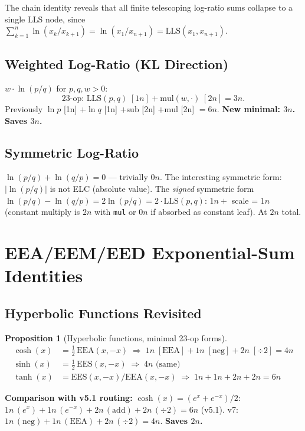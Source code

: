 \documentclass[11pt]{article}
\newtheorem{proposition}[theorem]{Proposition}
\begin{document}
The chain identity reveals that all finite telescoping log-ratio sums collapse to a single
LLS node, since $\sum_{k=1}^n\ln(x_k/x_{k+1})=\ln(x_1/x_{n+1})=\mathrm{LLS}(x_1,x_{n+1})$.

\subsection{Weighted Log-Ratio (KL Direction)}

$w\cdot\ln(p/q)$ for $p,q,w>0$:
\[
\text{23-op: }\mathrm{LLS}(p,q)\;[1n]+\mathrm{mul}(w,\cdot)\;[2n]=3n.
\]
Previously $\ln p$ [1n] $+\ln q$ [1n] $+\mathrm{sub}$ [2n] $+\mathrm{mul}$ [2n] $=6n$.
\textbf{New minimal: $3n$. Saves $3n$.}

\subsection{Symmetric Log-Ratio}

$\ln(p/q)+\ln(q/p)=0$ — trivially $0n$. The interesting symmetric form:
$|\ln(p/q)|$ is not ELC (absolute value). The \emph{signed} symmetric form
$\ln(p/q)-\ln(q/p)=2\ln(p/q)=2\cdot\mathrm{LLS}(p,q)$: $1n+$ scale = $1n$ (constant multiply
is $2n$ with \texttt{mul} or $0n$ if absorbed as constant leaf). At $2n$ total.

\section{EEA/EEM/EED Exponential-Sum Identities}

\subsection{Hyperbolic Functions Revisited}

\begin{proposition}[Hyperbolic functions, minimal 23-op forms]
\begin{align*}
\cosh(x)&=\tfrac12\,\mathrm{EEA}(x,-x)
  \;\Rightarrow\;1n\;[\mathrm{EEA}]+1n\;[\mathrm{neg}]+2n\;[\div 2]=4n\\
\sinh(x)&=\tfrac12\,\mathrm{EES}(x,-x)
  \;\Rightarrow\;4n\text{ (same)}\\
\tanh(x)&=\mathrm{EES}(x,-x)/\mathrm{EEA}(x,-x)
  \;\Rightarrow\;1n+1n+2n+2n=6n
\end{align*}
\end{proposition}

\textbf{Comparison with v5.1 routing:}
$\cosh(x)=(e^x+e^{-x})/2$: $1n\,(e^x)+1n\,(e^{-x})+2n\,(\text{add})+2n\,(\div 2)=6n$ (v5.1).
v7: $1n\,(\mathrm{neg})+1n\,(\mathrm{EEA})+2n\,(\div 2)=4n$.
\textbf{Saves $2n$.}
\end{document}
